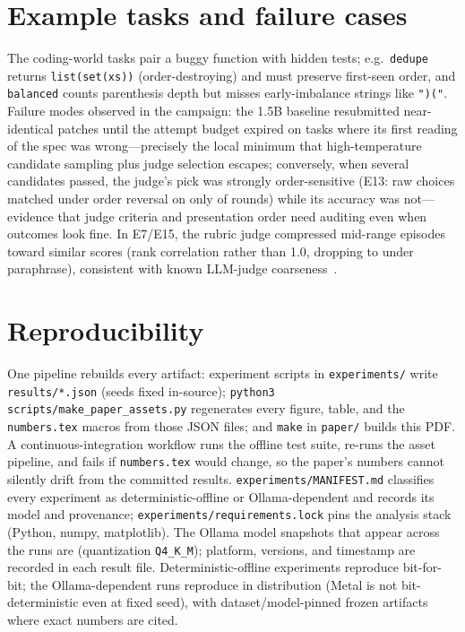 \documentclass[11pt]{article}
\begin{document}
\section{Example tasks and failure cases}\label{app:examples}
The coding-world tasks pair a buggy function with hidden tests; e.g.\
\texttt{dedupe} returns \texttt{list(set(xs))} (order-destroying) and must
preserve first-seen order, and \texttt{balanced} counts parenthesis depth but
misses early-imbalance strings like \texttt{")("}. Failure modes observed in
the campaign: the 1.5B baseline resubmitted near-identical patches until the
attempt budget expired on tasks where its first reading of the spec was
wrong---precisely the local minimum that high-temperature candidate sampling
plus judge selection escapes; conversely, when several candidates passed, the
judge's pick was strongly order-sensitive (E13: raw choices matched under
order reversal on only \OrderConsistency{} of rounds) while its accuracy was
not---evidence that judge criteria and presentation order need auditing even
when outcomes look fine. In E7/E15, the rubric judge compressed mid-range
episodes toward similar scores (rank correlation \JudgeSpearman{} rather than
1.0, dropping to \RubricParaRho{} under paraphrase), consistent with known
LLM-judge coarseness~\cite{llmjudge2023}.

\section{Reproducibility}
One pipeline rebuilds every artifact: experiment scripts in
\texttt{experiments/} write \texttt{results/*.json} (seeds fixed in-source);
\texttt{python3 scripts/make\_paper\_assets.py} regenerates every figure,
table, and the \texttt{numbers.tex} macros from those JSON files; and
\texttt{make} in \texttt{paper/} builds this PDF. A continuous-integration
workflow runs the offline test suite, re-runs the asset pipeline, and fails if
\texttt{numbers.tex} would change, so the paper's numbers cannot silently drift
from the committed results. \texttt{experiments/MANIFEST.md} classifies every
experiment as deterministic-offline or Ollama-dependent and records its model and
provenance; \texttt{experiments/requirements.lock} pins the analysis stack
(Python, numpy, matplotlib). The \NumModels{} Ollama model snapshots that appear
across the runs are \ModelList{} (quantization \texttt{Q4\_K\_M}); platform,
versions, and timestamp are recorded in each result file. Deterministic-offline
experiments reproduce bit-for-bit; the Ollama-dependent runs reproduce
in distribution (Metal is not bit-deterministic even at fixed seed), with
dataset/model-pinned frozen artifacts where exact numbers are cited.

\clearpage



\end{document}
